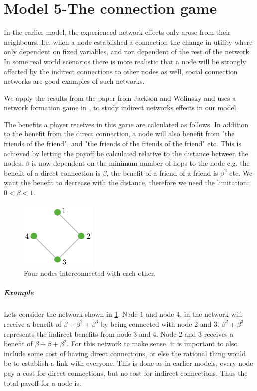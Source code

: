 \section{Model 5-The connection game}
In the earlier model, the experienced network effects only arose from their neighbours. I.e. when a node established a connection the change in utility where only dependent on fixed variables, and non dependent of the rest of the network. In some real world scenarios there is more realistic that a node will be strongly affected by the indirect connections to other nodes as well, social connection networks are good examples of such networks. 

We apply the results from the paper from Jackson and Wolinsky \cite{jackson1996strategic} and uses a network formation game in \cite{jackson2005survey}, to study indirect networks effects in our model. 

The benefits a player receives in this game are calculated as follows. In addition to the benefit from the direct connection, a node will also benefit from "the friends of the friend", and "the friends of the friends of the friend" etc. This is achieved by letting the payoff be calculated relative to the distance between the nodes. $\beta$ is now dependent on the minimum number of hops to the node e.g. the benefit of a direct connection is $\beta$, the benefit of a friend of a friend is $\beta^2$ etc. We want the benefit to decrease with the distance, therefore we need the limitation: $0<\beta<1$. 
\begin{figure}[h]
\centering
  \includegraphics[width=0.2\linewidth]{../Figures/connectionGame.png}
  \caption{\label{fig:connectionGame} Four nodes interconnected with each other.}
\end{figure}
\subparagraph{Example}Lets consider the network shown in \ref{fig:connectionGame}. Node 1 and node 4, in the network will receive a benefit of $\beta+\beta^{2}+\beta^{3}$ by being connected with node 2 and 3. $\beta^{2}+\beta^{3}$ represents the indirect benefits from node 3 and 4. Node 2 and 3 receives a benefit of $\beta+\beta+\beta^{2}$. For this network to make sense, it is important to also include some cost of having direct connections, or else the rational thing would be to establish a link with everyone. This is done as in earlier models, every node pay a cost for direct connections, but no cost for indirect connections. Thus the total payoff for a node is:

